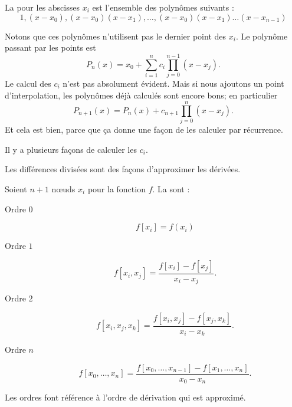 \begin{definition}
    La  pour les abscisses \( x_i\) est l'ensemble des polynômes suivants :
    \begin{equation}
        1,(x-x_0),(x-x_0)(x-x_1),\ldots,(x-x_0)(x-x_1)\ldots (x-x_{n-1})
    \end{equation}
\end{definition}
Notons que ces polynômes n'utilisent pas le dernier point des \( x_i\). Le polynôme passant par les points est
\begin{equation}
    P_n(x)=x_0+\sum_{i=1}^nc_i\prod_{j=0}^{n-1}(x-x_j).
\end{equation}
Le calcul des \( c_i\) n'est pas absolument évident. Mais si nous ajoutons un point d'interpolation, les polynômes déjà calculés sont encore bons; en particulier
\begin{equation}
    P_{n+1}(x)=P_n(x)+c_{n+1}\prod_{j=0}^{n}(x-x_j).
\end{equation}
Et cela est bien, parce que ça donne une façon de les calculer par récurrence.

Il y a plusieurs façons de calculer les \( c_i\).

Les différences divisées sont des façons d'approximer les dérivées.
\begin{definition}
    Soient \( n+1\) nœuds \( x_i\) pour la fonction \( f\). La  sont :
    \begin{description}
        \item[Ordre \( 0\)]
            \begin{equation}
                f[x_i]=f(x_i)
            \end{equation}
        \item[Ordre \( 1\)]
            \begin{equation}
                f[x_i,x_j]=\frac{ f[x_i]-f[x_j] }{ x_i-x_j }.
            \end{equation}
        \item[Ordre \( 2\)]
            \begin{equation}
                f[x_i,x_j,x_k]=\frac{ f[x_i,x_j]-f[x_j,x_k] }{ x_i-x_k }.
            \end{equation}
        \item[Ordre \( n\)]
            \begin{equation}
                f[x_0,\ldots, x_n]=\frac{ f[x_0,\ldots, x_{n-1}]-f[x_1,\ldots, x_n] }{ x_0-x_n }.
            \end{equation}
    \end{description}
\end{definition}
Les ordres font référence à l'ordre de dérivation qui est approximé.

